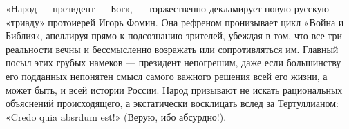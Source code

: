 «Народ — президент — Бог», — торжественно декламирует новую русскую «триаду» протоиерей Игорь Фомин. Она рефреном пронизывает цикл «Война и Библия», апеллируя прямо к подсознанию зрителей, убеждая в том, что все три реальности вечны и бессмысленно возражать или сопротивляться им. Главный посыл этих грубых намеков — президент непогрешим, даже если большинству его подданных непонятен смысл самого важного решения всей его жизни, а может быть, и всей истории России. Народ призывают не искать рациональных объяснений происходящего, а экстатически восклицать вслед за Тертуллианом: «Credo quia absrdum est!» (Верую, ибо абсурдно!).

